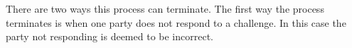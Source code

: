 %
%
%
%

There are two ways this process can terminate. The first way the process terminates is when one party does not respond to a challenge. In this case the party not responding is deemed to be incorrect.

